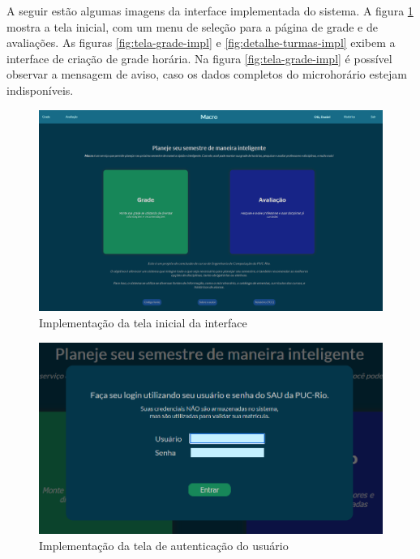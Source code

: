 A seguir estão algumas imagens da interface implementada do sistema. A figura \ref{fig:tela-inicial-impl} mostra a tela inicial, com um menu de seleção para a página de grade e de avaliações. As figuras \ref{fig:tela-grade-impl} e \ref{fig:detalhe-turmas-impl} exibem a interface de criação de grade horária. 
Na figura \ref{fig:tela-grade-impl} é possível observar a mensagem de aviso, caso os dados completos do microhorário estejam indisponíveis.

\begin{figure}[ht]
    \begin{center}
    \includegraphics[width=360pt]{figuras/tela-inicial.png}
    \caption{Implementação da tela inicial da interface}
    \label{fig:tela-inicial-impl}
    \end{center}
\end{figure}

\begin{figure}[ht]
    \begin{center}
    \includegraphics[width=360pt]{figuras/autenticacao-usuario.png}
    \caption{Implementação da tela de autenticação do usuário}
    \label{fig:tela-autenticacao-impl}
    \end{center}
\end{figure}

